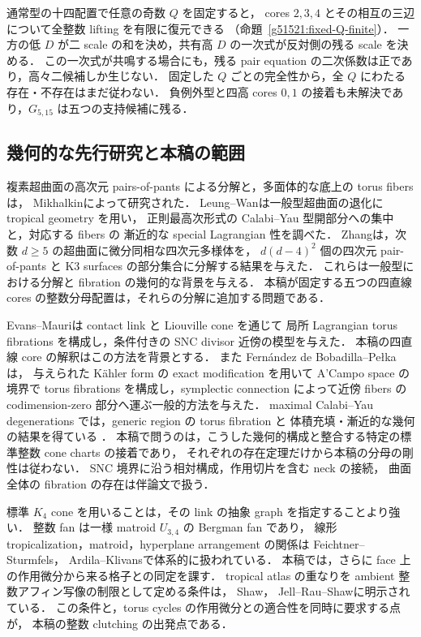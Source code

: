 通常型の十四配置で任意の奇数 $Q$ を固定すると，
cores $2,3,4$ とその相互の三辺について全整数 lifting を有限に復元できる
（命題~\ref{g51521:fixed-Q-finite}）．
一方の低 $D$ が二 scale の和を決め，共有高 $D$ の一次式が反対側の残る scale を決める．
この一次式が共鳴する場合にも，残る pair equation の二次係数は正であり，高々二候補しか生じない．
固定した $Q$ ごとの完全性から，全 $Q$ にわたる存在・不存在はまだ従わない．
負例外型と四高 cores $0,1$ の接着も未解決であり，$G_{5,15}$ は五つの支持候補に残る．

\subsection{幾何的な先行研究と本稿の範囲}

複素超曲面の高次元 pairs-of-pants による分解と，多面体的な底上の torus fibers は，
Mikhalkin\cite[Theorems~1 and~1$'$]{Mikhalkin}によって研究された．
Leung--Wan\cite{LeungWan}は一般型超曲面の退化に tropical geometry を用い，
正則最高次形式の Calabi--Yau 型開部分への集中と，対応する fibers の
漸近的な special Lagrangian 性を調べた．
Zhang\cite[Theorem~1.1]{Zhang}は，次数 $d\ge5$ の超曲面に微分同相な四次元多様体を，
$d(d-4)^2$ 個の四次元 pair-of-pants と K3 surfaces の部分集合に分解する結果を与えた．
これらは一般型における分解と fibration の幾何的な背景を与える．
本稿が固定する五つの四直線 cores の整数分母配置は，それらの分解に追加する問題である．

Evans--Mauri\cite{EM}は contact link と Liouville cone を通じて
局所 Lagrangian torus fibrations を構成し，条件付きの SNC divisor 近傍の模型を与えた．
本稿の四直線 core の解釈はこの方法を背景とする．
また Fernández de Bobadilla--Pełka\cite[Theorem~6.14]{FernandezBobadillaPelka}は，
与えられた Kähler form の exact modification を用いて A'Campo space の境界で
torus fibrations を構成し，symplectic connection によって近傍 fibers の
codimension-zero 部分へ運ぶ一般的方法を与えた．
maximal Calabi--Yau degenerations では，generic region の torus fibration と
体積充填・漸近的な幾何の結果を得ている
\cite[Theorems~1.1--1.2]{FernandezBobadillaPelka}．
本稿で問うのは，こうした幾何的構成と整合する特定の標準整数 cone charts の接着であり，
それぞれの存在定理だけから本稿の分母の剛性は従わない．
SNC 境界に沿う相対構成，作用切片を含む neck の接続，
曲面全体の fibration の存在は伴論文\cite{SurfaceGeometry}で扱う．

標準 $K_4$ cone を用いることは，その link の抽象 graph を指定することより強い．
整数 fan は一様 matroid $U_{3,4}$ の Bergman fan であり，
線形 tropicalization，matroid，hyperplane arrangement の関係は
Feichtner--Sturmfels\cite{FeichtnerSturmfels}，
Ardila--Klivans\cite{ArdilaKlivans}で体系的に扱われている．
本稿では，さらに face 上の作用微分から来る格子との同定を課す．
tropical atlas の重なりを ambient 整数アフィン写像の制限として定める条件は，
Shaw\cite[Definition~3.1]{ShawSurfaces}，
Jell--Rau--Shaw\cite[Definitions~2.1 and~5.1]{JellRauShaw}に明示されている．
この条件と，torus cycles の作用微分との適合性を同時に要求する点が，
本稿の整数 clutching の出発点である．

